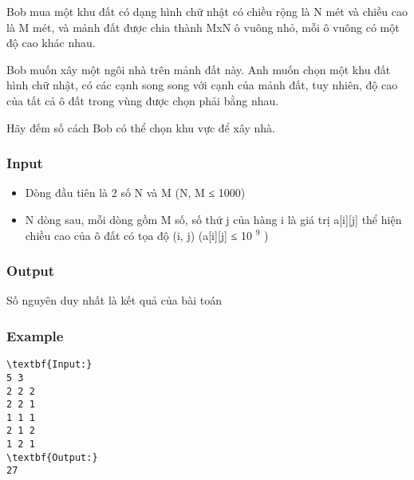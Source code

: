 

Bob mua một khu đất có dạng hình chữ nhật có chiều rộng là N mét và chiều cao là M mét, và mảnh đất được chia thành MxN ô vuông nhỏ, mỗi ô vuông có một độ cao khác nhau.

Bob muốn xây một ngôi nhà trên mảnh đất này. Anh muốn chọn một khu đất hình chữ nhật, có các cạnh song song với cạnh của mảnh đất, tuy nhiên, độ cao của tất cả ô đất trong vùng được chọn phải bằng nhau.

Hãy đếm số cách Bob có thể chọn khu vực để xây nhà.

\subsubsection{Input}
\begin{itemize}
	\item Dòng đầu tiên là 2 số N và M (N, M ≤ 1000)
	\item N dòng sau, mỗi dòng gồm M số, số thứ j của hàng i là giá trị a[i][j] thể hiện chiều cao của ô đất có tọa độ (i, j) (a[i][j] ≤ 10 $^ 9 $ )
\end{itemize}

\subsubsection{Output}

Số nguyên duy nhất là kết quả của bài toán

\subsubsection{Example}
\begin{verbatim}
\textbf{Input:}
5 3
2 2 2
2 2 1
1 1 1
2 1 2
1 2 1
\textbf{Output:} 
27\end{verbatim}